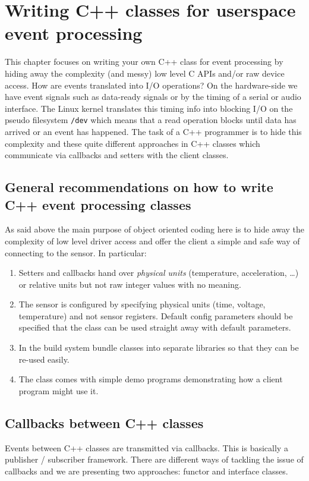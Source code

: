 \documentclass[12pt]{report}
\begin{document}
\chapter{Writing C++ classes for userspace event processing\label{drivers}}
This chapter focuses on writing your own C++ class for event processing by
hiding away the complexity (and messy) low level C APIs and/or raw
device access. How are events translated into I/O operations? On the
hardware-side we have event signals such as data-ready signals or by
the timing of a serial or audio interface. The Linux kernel translates
this timing info into blocking I/O on the pseudo filesystem \texttt{/dev}
which means that a read operation blocks until data has arrived
or an event has happened. The task of a C++ programmer is
to hide this complexity and these quite different approaches in C++
classes which communicate via callbacks and setters with the client
classes.

\section{General recommendations on how to write C++ event processing classes}
As said above the main purpose of object oriented coding here is to
hide away the complexity of low level driver access and offer the
client a simple and safe way of connecting to the sensor. In
particular:
\begin{enumerate}
\item Setters and callbacks hand over \textsl{physical units}
  (temperature, acceleration, \ldots) or relative units but not raw
  integer values with no meaning.
\item The sensor is configured by specifying physical units (time,
  voltage, temperature) and not sensor registers. Default config parameters
  should be specified that the class can be used straight away with
  default parameters.
\item In the build system bundle classes into separate libraries so that they
  can be re-used easily.
\item The class comes with simple demo programs demonstrating how
  a client program might use it.
\end{enumerate}



\section{Callbacks between C++ classes}
Events between C++ classes are transmitted via callbacks. This is basically a
publisher / subscriber framework.
There are different ways of tackling the issue of callbacks and we are presenting
two approaches: functor and interface classes.
\end{document}

